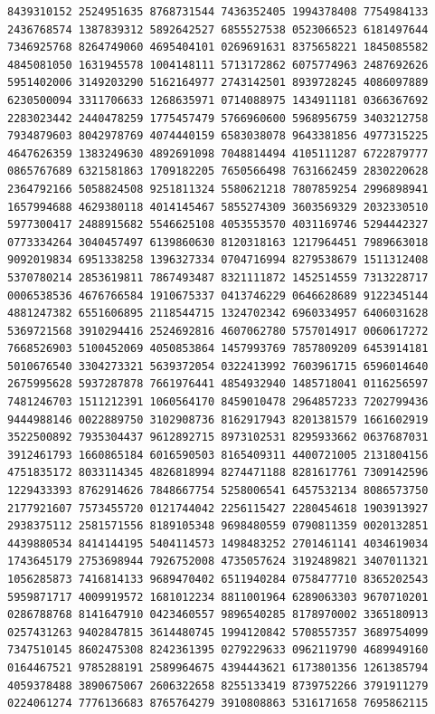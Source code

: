 \begin{Verbatim}[fontsize=\fontsize{6.4}{7.3}\selectfont]
8439310152 2524951635 8768731544 7436352405 1994378408 7754984133 2436768574 1387839312 5892642527 6855527538 0523066523 6181497644
7346925768 8264749060 4695404101 0269691631 8375658221 1845085582 4845081050 1631945578 1004148111 5713172862 6075774963 2487692626
5951402006 3149203290 5162164977 2743142501 8939728245 4086097889 6230500094 3311706633 1268635971 0714088975 1434911181 0366367692
2283023442 2440478259 1775457479 5766960600 5968956759 3403212758 7934879603 8042978769 4074440159 6583038078 9643381856 4977315225
4647626359 1383249630 4892691098 7048814494 4105111287 6722879777 0865767689 6321581863 1709182205 7650566498 7631662459 2830220628
2364792166 5058824508 9251811324 5580621218 7807859254 2996898941 1657994688 4629380118 4014145467 5855274309 3603569329 2032330510
5977300417 2488915682 5546625108 4053553570 4031169746 5294442327 0773334264 3040457497 6139860630 8120318163 1217964451 7989663018
9092019834 6951338258 1396327334 0704716994 8279538679 1511312408 5370780214 2853619811 7867493487 8321111872 1452514559 7313228717
0006538536 4676766584 1910675337 0413746229 0646628689 9122345144 4881247382 6551606895 2118544715 1324702342 6960334957 6406031628
5369721568 3910294416 2524692816 4607062780 5757014917 0060617272 7668526903 5100452069 4050853864 1457993769 7857809209 6453914181
5010676540 3304273321 5639372054 0322413992 7603961715 6596014640 2675995628 5937287878 7661976441 4854932940 1485718041 0116256597
7481246703 1511212391 1060564170 8459010478 2964857233 7202799436 9444988146 0022889750 3102908736 8162917943 8201381579 1661602919
3522500892 7935304437 9612892715 8973102531 8295933662 0637687031 3912461793 1660865184 6016590503 8165409311 4400721005 2131804156
4751835172 8033114345 4826818994 8274471188 8281617761 7309142596 1229433393 8762914626 7848667754 5258006541 6457532134 8086573750
2177921607 7573455720 0121744042 2256115427 2280454618 1903913927 2938375112 2581571556 8189105348 9698480559 0790811359 0020132851
4439880534 8414144195 5404114573 1498483252 2701461141 4034619034 1743645179 2753698944 7926752008 4735057624 3192489821 3407011321
1056285873 7416814133 9689470402 6511940284 0758477710 8365202543 5959871717 4009919572 1681012234 8811001964 6289063303 9670710201
0286788768 8141647910 0423460557 9896540285 8178970002 3365180913 0257431263 9402847815 3614480745 1994120842 5708557357 3689754099
7347510145 8602475308 8242361395 0279229633 0962119790 4689949160 0164467521 9785288191 2589964675 4394443621 6173801356 1261385794
4059378488 3890675067 2606322658 8255133419 8739752266 3791911279 0224061274 7776136683 8765764279 3910808863 5316171658 7695862115

\end{Verbatim}
